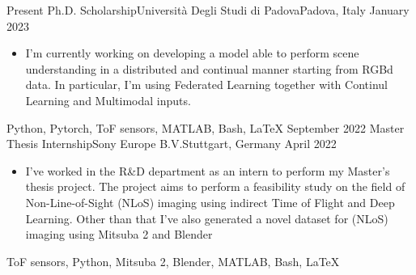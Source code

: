 %
%
%
\begin{experiences}
    \experience
        {Present}            {Ph.D. Scholarship}{Università Degli Studi di Padova}{Padova, Italy}
        {January 2023}       {\begin{itemize}
                                 \item I'm currently working on developing a model able to perform scene understanding in a distributed and continual manner starting from RGBd data. In particular, I'm using Federated Learning together with Continul Learning and Multimodal inputs.
                             \end{itemize}
                            }
                            {Python, Pytorch, ToF sensors, MATLAB, Bash, \LaTeX}
    \experience
        {September 2022}    {Master Thesis Internship}{Sony Europe B.V.}{Stuttgart, Germany}
        {April 2022}        {\begin{itemize}
                                 \item I've worked in the R\&D department as an intern to perform my Master's thesis project. The project aims to perform a feasibility study on the field of Non-Line-of-Sight (NLoS) imaging using indirect Time of Flight and Deep Learning. Other than that I've also generated a novel dataset for (NLoS) imaging using Mitsuba 2 and Blender
                             \end{itemize}
                            }
                            {ToF sensors, Python, Mitsuba 2, Blender, MATLAB, Bash, \LaTeX}
                    
\end{experiences}
